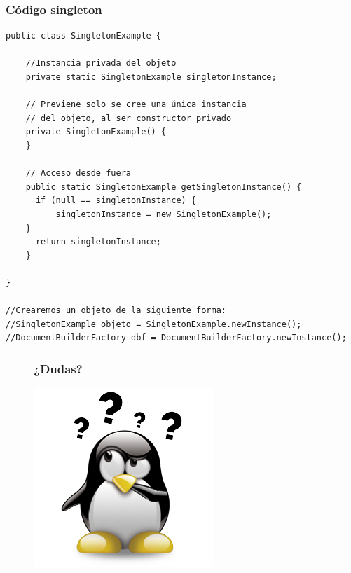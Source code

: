 \documentclass{beamer}
\begin{document}
\begin{frame}[fragile]
\frametitle{Código singleton}
\begin{scriptsize}

\begin{verbatim}
public class SingletonExample {

    //Instancia privada del objeto
    private static SingletonExample singletonInstance;

    // Previene solo se cree una única instancia
    // del objeto, al ser constructor privado
    private SingletonExample() {
	}

    // Acceso desde fuera
    public static SingletonExample getSingletonInstance() {
      if (null == singletonInstance) {
          singletonInstance = new SingletonExample();
    }
      return singletonInstance;
    }

}

//Crearemos un objeto de la siguiente forma:
//SingletonExample objeto = SingletonExample.newInstance();
//DocumentBuilderFactory dbf = DocumentBuilderFactory.newInstance();
\end{verbatim}

\end{scriptsize}
\end{frame}


\begin{frame}
\begin{figure}
\frametitle{¿Dudas?}
\includegraphics[scale=0.8]{imagenes/dudas.png}
\end{figure}
\end{frame}
\end{document}
